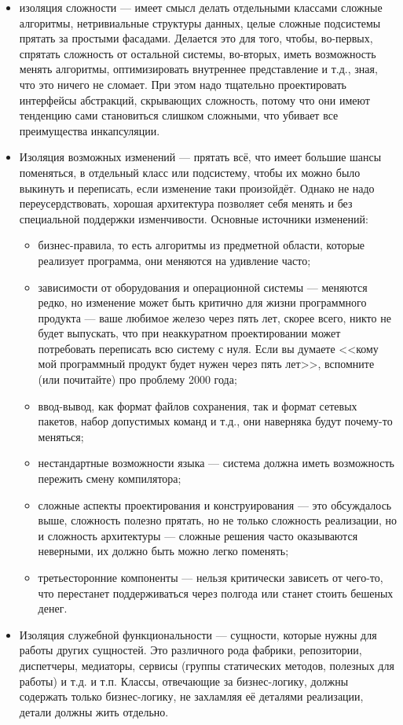 \documentclass[a5paper]{article}
\begin{document}
\begin{itemize}
    \item изоляция сложности --- имеет смысл делать отдельными классами сложные алгоритмы, нетривиальные структуры данных, целые сложные подсистемы прятать за простыми фасадами. Делается это для того, чтобы, во-первых, спрятать сложность от остальной системы, во-вторых, иметь возможность менять алгоритмы, оптимизировать внутреннее представление и т.д., зная, что это ничего не сломает. При этом надо тщательно проектировать интерфейсы абстракций, скрывающих сложность, потому что они имеют тенденцию сами становиться слишком сложными, что убивает все преимущества инкапсуляции.
    \item Изоляция возможных изменений --- прятать всё, что имеет большие шансы поменяться, в отдельный класс или подсистему, чтобы их можно было выкинуть и переписать, если изменение таки произойдёт. Однако не надо переусердствовать, хорошая архитектура позволяет себя менять и без специальной поддержки изменчивости. Основные источники изменений:
    \begin{itemize}
        \item бизнес-правила, то есть алгоритмы из предметной области, которые реализует программа, они меняются на удивление часто;
        \item зависимости от оборудования и операционной системы --- меняются редко, но изменение может быть критично для жизни программного продукта --- ваше любимое железо через пять лет, скорее всего, никто не будет выпускать, что при неаккуратном проектировании может потребовать переписать всю систему с нуля. Если вы думаете <<кому мой программный продукт будет нужен через пять лет>>, вспомните (или почитайте) про проблему 2000 года;
        \item ввод-вывод, как формат файлов сохранения, так и формат сетевых пакетов, набор допустимых команд и т.д., они наверняка будут почему-то меняться;
        \item нестандартные возможности языка --- система должна иметь возможность пережить смену компилятора;
        \item сложные аспекты проектирования и конструирования --- это обсуждалось выше, сложность полезно прятать, но не только сложность реализации, но и сложность архитектуры --- сложные решения часто оказываются неверными, их должно быть можно легко поменять;
        \item третьесторонние компоненты --- нельзя критически зависеть от чего-то, что перестанет поддерживаться через полгода или станет стоить бешеных денег.
    \end{itemize}
    \item Изоляция служебной функциональности --- сущности, которые нужны для работы других сущностей. Это различного рода фабрики, репозитории, диспетчеры, медиаторы, сервисы (группы статических методов, полезных для работы) и т.д. и т.п. Классы, отвечающие за бизнес-логику, должны содержать только бизнес-логику, не захламляя её деталями реализации, детали должны жить отдельно.
\end{itemize}
\end{document}
